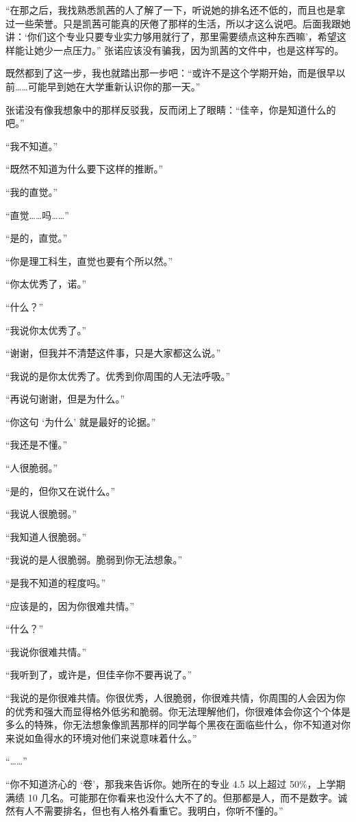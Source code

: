 \documentclass[UTF8]{ctexart}
\begin{document}
“在那之后，我找熟悉凯茜的人了解了一下，听说她的排名还不低的，而且也是拿过一些荣誉。只是凯茜可能真的厌倦了那样的生活，所以才这么说吧。后面我跟她讲：‘你们这个专业只要专业实力够用就行了，那里需要绩点这种东西嘛’，希望这样能让她少一点压力。”
张诺应该没有骗我，因为凯茜的文件中，也是这样写的。

既然都到了这一步，我也就踏出那一步吧：“或许不是这个学期开始，而是很早以前……可能早到她在大学重新认识你的那一天。”

张诺没有像我想象中的那样反驳我，反而闭上了眼睛：“佳辛，你是知道什么的吧。”

“我不知道。”

“既然不知道为什么要下这样的推断。”

“我的直觉。”

“直觉……吗……”

“是的，直觉。”

“你是理工科生，直觉也要有个所以然。”

“你太优秀了，诺。”

“什么？”

“我说你太优秀了。”

“谢谢，但我并不清楚这件事，只是大家都这么说。”

“我说的是你太优秀了。优秀到你周围的人无法呼吸。”

“再说句谢谢，但是为什么。”

“你这句 ‘为什么’ 就是最好的论据。”

“我还是不懂。”

“人很脆弱。”

“是的，但你又在说什么。”

“我说人很脆弱。”

“我知道人很脆弱。”

“我说的是人很脆弱。脆弱到你无法想象。”

“是我不知道的程度吗。”

“应该是的，因为你很难共情。”

“什么？”

“我说你很难共情。”

“我听到了，或许是，但佳辛你不要再说了。”

“我说的是你很难共情。你很优秀，人很脆弱，你很难共情，你周围的人会因为你的优秀和强大而显得格外低劣和脆弱。你无法理解他们，你很难体会你这个个体是多么的特殊，你无法想象像凯茜那样的同学每个黑夜在面临些什么，你不知道对你来说如鱼得水的环境对他们来说意味着什么。”

“……”

“你不知道济心的 ‘卷’，那我来告诉你。她所在的专业 4.5 以上超过 50\%，上学期满绩 10 几名。可能那在你看来也没什么大不了的。但那都是人，而不是数字。诚然有人不需要排名，但也有人格外看重它。我明白，你听不懂的。”
\end{document}
